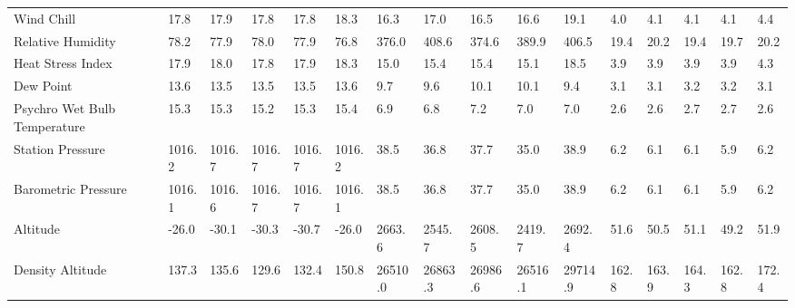 \documentclass[a4paper]{article}
\begin{document}
{\begin{table}[htbp]
{\begin{tabular}{llllllllllllllll}
Wind Chill                   & 17.8       & 17.9       & 17.8       & 17.8       & 18.3                            & 16.3       & 17.0       & 16.5       & 16.6       & 19.1                            & 4.0        & 4.1        & 4.1        & 4.1        & 4.4        \\
Relative Humidity            & 78.2       & 77.9       & 78.0       & 77.9       & 76.8                            & 376.0      & 408.6      & 374.6      & 389.9      & 406.5                           & 19.4       & 20.2       & 19.4       & 19.7       & 20.2       \\
Heat Stress Index            & 17.9       & 18.0       & 17.8       & 17.9       & 18.3                            & 15.0       & 15.4       & 15.4       & 15.1       & 18.5                            & 3.9        & 3.9        & 3.9        & 3.9        & 4.3        \\
Dew Point                    & 13.6       & 13.5       & 13.5       & 13.5       & 13.6                            & 9.7        & 9.6        & 10.1       & 10.1       & 9.4                             & 3.1        & 3.1        & 3.2        & 3.2        & 3.1        \\
Psychro Wet Bulb Temperature & 15.3       & 15.3       & 15.2       & 15.3       & 15.4                            & 6.9        & 6.8        & 7.2        & 7.0        & 7.0                             & 2.6        & 2.6        & 2.7        & 2.7        & 2.6        \\
Station Pressure             & 1016.2     & 1016.7     & 1016.7     & 1016.7     & 1016.2                          & 38.5       & 36.8       & 37.7       & 35.0       & 38.9                            & 6.2        & 6.1        & 6.1        & 5.9        & 6.2        \\
Barometric Pressure          & 1016.1     & 1016.6     & 1016.7     & 1016.7     & 1016.1                          & 38.5       & 36.8       & 37.7       & 35.0       & 38.9                            & 6.2        & 6.1        & 6.1        & 5.9        & 6.2        \\
Altitude                     & -26.0      & -30.1      & -30.3      & -30.7      & -26.0                           & 2663.6     & 2545.7     & 2608.5     & 2419.7     & 2692.4                          & 51.6       & 50.5       & 51.1       & 49.2       & 51.9       \\
Density Altitude             & 137.3      & 135.6      & 129.6      & 132.4      & 150.8                           & 26510.0    & 26863.3    & 26986.6    & 26516.1    & 29714.9                         & 162.8      & 163.9      & 164.3      & 162.8      & 172.4      \\

\end{tabular}}
\end{table}}
\end{document}
